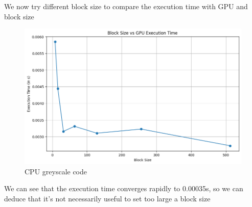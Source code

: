 \documentclass[a4paper]{article}
\begin{document}
We now try different block size to compare the execution time with GPU and block size

\begin{figure}[h]
    \centering
    \includegraphics[scale=0.5]{src/block_size.png}
    \caption{CPU greyscale code}
    \end{figure}



We can see that the execution time converges rapidly to 0.00035s, 
so we can deduce that it's not necessarily useful to set too large a block size
\end{document}
